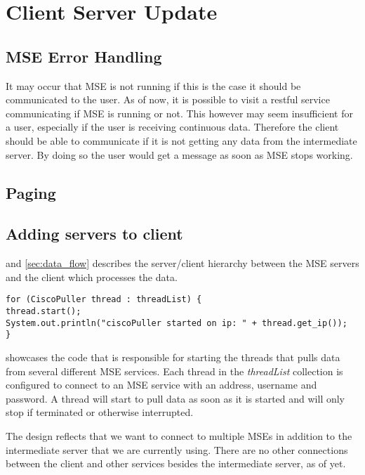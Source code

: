 \section{Client Server Update}


\subsection*{MSE Error Handling}
It may occur that MSE is not running if this is the case it should be communicated to the user. As of now, it is possible to visit a restful service communicating if MSE is running or not. This however may seem insufficient for a user, especially if the user is receiving continuous data. Therefore the client should be able to communicate if it is not getting any data from the intermediate server. By doing so the user would get a message as soon as MSE stops working.


\subsection*{Paging}

\subsection*{Adding servers to client}
 and \cref{sec:data_flow} describes the server/client hierarchy between the MSE servers and the client which processes the data. 
\begin{lstlisting}[caption={Starting multiple threads to pull data from multiple MSE servers}, label={lst:cisco_puller}, language=inc_Java]
for (CiscoPuller thread : threadList) {
thread.start();
System.out.println("ciscoPuller started on ip: " + thread.get_ip());
}
\end{lstlisting}
 showcases the code that is responsible for starting the threads that pulls data from several different MSE services. Each thread in the \textit{threadList} collection is configured to connect to an MSE service with an address, username and password. A thread will start to pull data as soon as it is started and will only stop if terminated or otherwise interrupted.

The design reflects that we want to connect to multiple MSEs in addition to the intermediate server that we are currently using. There are no other connections between the client and other services besides the intermediate server, as of yet.